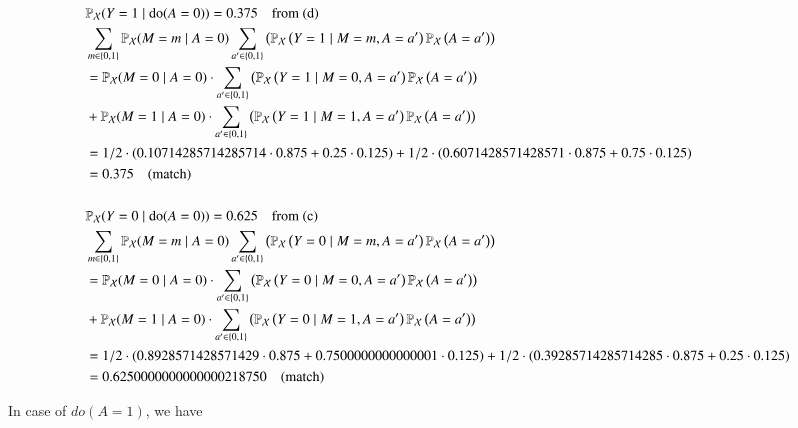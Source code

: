 \documentclass[10pt]{article}
\begin{document}
\begin{align*}
    &\mathbb{P}_{\mathcal{X}}(Y=1 \mid \operatorname{do}(A=0))=0.375 \quad \text{from (d)}\\
    &\sum_{m \in\{0,1\}} \mathbb{P}_{\mathcal{X}}(M=m \mid A=0) \sum_{a^{\prime} \in\{0,1\}}\left(\mathbb{P}_{\mathcal{X}}\left(Y=1 \mid M=m, A=a^{\prime}\right) \mathbb{P}_{\mathcal{X}}\left(A=a^{\prime}\right)\right)\\
    &= \mathbb{P}_{\mathcal{X}}(M=0 \mid A=0) \cdot \sum_{a^{\prime} \in\{0,1\}}\left(\mathbb{P}_{\mathcal{X}}\left(Y=1 \mid M=0, A=a^{\prime}\right) \mathbb{P}_{\mathcal{X}}\left(A=a^{\prime}\right)\right) \\ 
    &+ \mathbb{P}_{\mathcal{X}}(M=1 \mid A=0) \cdot \sum_{a^{\prime} \in\{0,1\}}\left(\mathbb{P}_{\mathcal{X}}\left(Y=1 \mid M=1, A=a^{\prime}\right) \mathbb{P}_{\mathcal{X}}\left(A=a^{\prime}\right)\right) \\
    &= 1/2 \cdot (0.10714285714285714\cdot 0.875 + 0.25 \cdot 0.125) + 1/2 \cdot(0.6071428571428571 \cdot 0.875 + 0.75\cdot 0.125)\\
    &= 0.375 \text{\quad (match)}\\\\
    &\mathbb{P}_{\mathcal{X}}(Y=0 \mid \operatorname{do}(A=0))=0.625 \quad \text{from (c)}\\
    &\sum_{m \in\{0,1\}} \mathbb{P}_{\mathcal{X}}(M=m \mid A=0) \sum_{a^{\prime} \in\{0,1\}}\left(\mathbb{P}_{\mathcal{X}}\left(Y=0 \mid M=m, A=a^{\prime}\right) \mathbb{P}_{\mathcal{X}}\left(A=a^{\prime}\right)\right)\\
    &= \mathbb{P}_{\mathcal{X}}(M=0 \mid A=0) \cdot \sum_{a^{\prime} \in\{0,1\}}\left(\mathbb{P}_{\mathcal{X}}\left(Y=0 \mid M=0, A=a^{\prime}\right) \mathbb{P}_{\mathcal{X}}\left(A=a^{\prime}\right)\right) \\ 
    &+ \mathbb{P}_{\mathcal{X}}(M=1 \mid A=0) \cdot \sum_{a^{\prime} \in\{0,1\}}\left(\mathbb{P}_{\mathcal{X}}\left(Y=0 \mid M=1, A=a^{\prime}\right) \mathbb{P}_{\mathcal{X}}\left(A=a^{\prime}\right)\right) \\
    &= 1/2 \cdot (0.8928571428571429\cdot 0.875 + 0.7500000000000001 \cdot 0.125) + 1/2 \cdot(0.39285714285714285 \cdot 0.875 + 0.25\cdot 0.125)\\
    &= 0.6250000000000000218750 \text{\quad (match)}
\end{align*}

In case of $do(A=1)$, we have
\end{document}
